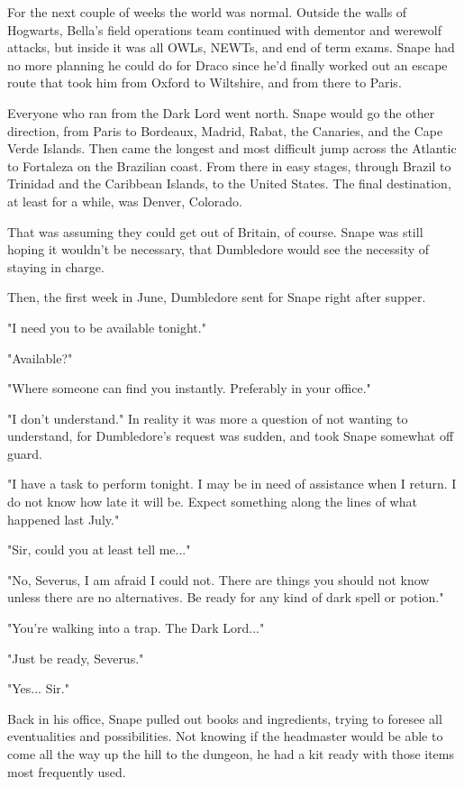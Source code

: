 For the next couple of weeks the world was normal. Outside the walls of Hogwarts, Bella's field operations team continued with dementor and werewolf attacks, but inside it was all OWLs, NEWTs, and end of term exams. Snape had no more planning he could do for Draco since he'd finally worked out an escape route that took him from Oxford to Wiltshire, and from there to Paris.

Everyone who ran from the Dark Lord went north. Snape would go the other direction, from Paris to Bordeaux, Madrid, Rabat, the Canaries, and the Cape Verde Islands. Then came the longest and most difficult jump across the Atlantic to Fortaleza on the Brazilian coast. From there in easy stages, through Brazil to Trinidad and the Caribbean Islands, to the United States. The final destination, at least for a while, was Denver, Colorado.

That was assuming they could get out of Britain, of course. Snape was still hoping it wouldn't be necessary, that Dumbledore would see the necessity of staying in charge.

Then, the first week in June, Dumbledore sent for Snape right after supper.

"I need you to be available tonight."

"Available?"

"Where someone can find you instantly. Preferably in your office."

"I don't understand." In reality it was more a question of not wanting to understand, for Dumbledore's request was sudden, and took Snape somewhat off guard.

"I have a task to perform tonight. I may be in need of assistance when I return. I do not know how late it will be. Expect something along the lines of what happened last July."

"Sir, could you at least tell me..."

"No, Severus, I am afraid I could not. There are things you should not know unless there are no alternatives. Be ready for any kind of dark spell or potion."

"You're walking into a trap. The Dark Lord..."

"Just be ready, Severus."

"Yes... Sir."

Back in his office, Snape pulled out books and ingredients, trying to foresee all eventualities and possibilities. Not knowing if the headmaster would be able to come all the way up the hill to the dungeon, he had a kit ready with those items most frequently used.

